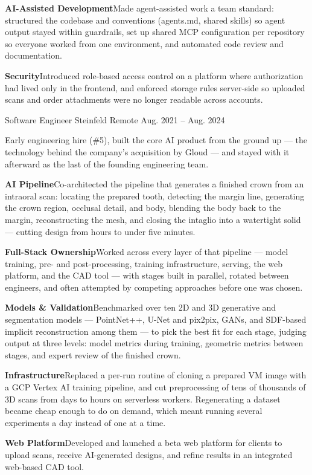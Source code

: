 \begin{cventries}
{\begin{cvitems}
        \item {\textbf{AI-Assisted Development}\enspace Made agent-assisted work a team standard: structured the codebase and conventions (agents.md, shared skills) so agent output stayed within guardrails, set up shared MCP configuration per repository so everyone worked from one environment, and automated code review and documentation.}
        \item {\textbf{Security}\enspace Introduced role-based access control on a platform where authorization had lived only in the frontend, and enforced storage rules server-side so uploaded scans and order attachments were no longer readable across accounts.}
      \end{cvitems}
    }

  \cventry
    {Software Engineer} %
    {Steinfeld} %
    {Remote} %
    {Aug. 2021 -- Aug. 2024} %
    {
      \begin{cvitems}
        \item {Early engineering hire (\#5), built the core AI product from the ground up — the technology behind the company’s acquisition by Gloud — and stayed with it afterward as the last of the founding engineering team.}
        \item {\textbf{AI Pipeline}\enspace Co-architected the pipeline that generates a finished crown from an intraoral scan: locating the prepared tooth, detecting the margin line, generating the crown region, occlusal detail, and body, blending the body back to the margin, reconstructing the mesh, and closing the intaglio into a watertight solid — cutting design from hours to under five minutes.}
        \item {\textbf{Full-Stack Ownership}\enspace Worked across every layer of that pipeline — model training, pre- and post-processing, training infrastructure, serving, the web platform, and the CAD tool — with stages built in parallel, rotated between engineers, and often attempted by competing approaches before one was chosen.}
        \item {\textbf{Models \& Validation}\enspace Benchmarked over ten 2D and 3D generative and segmentation models — PointNet++, U-Net and pix2pix, GANs, and SDF-based implicit reconstruction among them — to pick the best fit for each stage, judging output at three levels: model metrics during training, geometric metrics between stages, and expert review of the finished crown.}
        \item {\textbf{Infrastructure}\enspace Replaced a per-run routine of cloning a prepared VM image with a GCP Vertex AI training pipeline, and cut preprocessing of tens of thousands of 3D scans from days to hours on serverless workers. Regenerating a dataset became cheap enough to do on demand, which meant running several experiments a day instead of one at a time.}
        \item {\textbf{Web Platform}\enspace Developed and launched a beta web platform for clients to upload scans, receive AI-generated designs, and refine results in an integrated web-based CAD tool.}
      \end{cvitems}
    }


\end{cventries}
